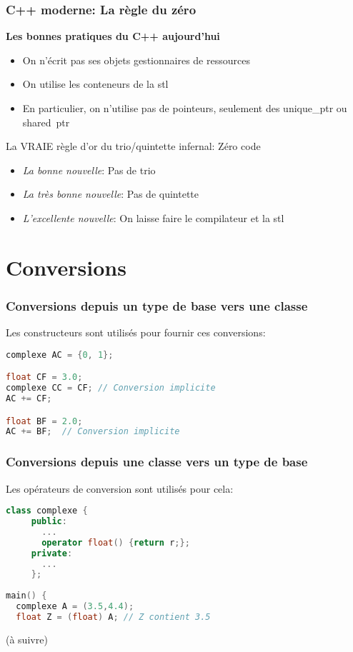 \documentclass{beamer}
\begin{document}
\begin{frame}[fragile=singleslide,shrink=20]
\frametitle {C++ moderne: La règle du zéro}

\textbf{Les bonnes pratiques du C++ aujourd'hui}

\begin{itemize}
\item{On n'écrit pas ses objets gestionnaires de ressources}
\item{On utilise les conteneurs de la stl}
\item{En particulier, on n'utilise pas de pointeurs, seulement des unique\_ptr ou shared\ ptr}
\end{itemize}

\begin{block}{La VRAIE règle d'or du trio/quintette infernal: Zéro code}
\begin{itemize}
\item{\textit{La bonne nouvelle}: Pas de trio }
\item{\textit{La très bonne nouvelle}: Pas de quintette }
\item{\textit{L'excellente nouvelle}: On laisse faire le compilateur et la stl}
\end{itemize}
\end{block}

\end{frame}

\section{Conversions}
\begin{frame}[fragile=singleslide,shrink=20]
\frametitle {Conversions depuis un type de base vers une classe}

Les constructeurs sont utilisés pour fournir ces conversions:
\begin{lstlisting}[language=c++]
complexe AC = {0, 1};

float CF = 3.0;
complexe CC = CF; // Conversion implicite
AC += CF;

float BF = 2.0;
AC += BF;  // Conversion implicite
\end{lstlisting}
\end{frame}

\begin{frame}[fragile=singleslide,shrink=20]
\frametitle {Conversions depuis une classe vers un type de base}

Les opérateurs de conversion sont utilisés pour cela:
\begin{lstlisting}[language=c++]
class complexe {
     public:
       ...
       operator float() {return r;};
     private:
       ...
     };
     
main() {
  complexe A = (3.5,4.4);
  float Z = (float) A; // Z contient 3.5
\end{lstlisting}
\end{frame}

\begin{frame}
(à suivre)
\end{frame}
\end{document}
